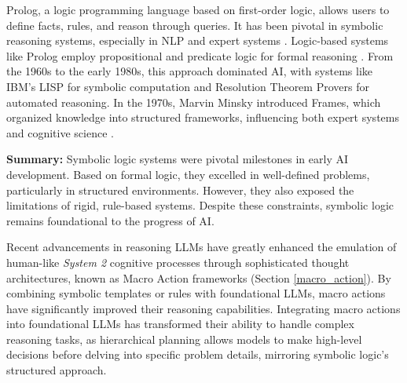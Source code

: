 Prolog, a logic programming language based on first-order logic, allows users to define facts, rules, and reason through queries. 
It has been pivotal in symbolic reasoning systems, especially in NLP and expert systems \cite{colmerauer1990introduction, clocksin2003programming, apt1997logic}. Logic-based systems like Prolog employ propositional and predicate logic for formal reasoning \cite{singh1999formal, jeroslow1988computation}. 
From the 1960s to the early 1980s, this approach dominated AI, with systems like IBM's LISP \cite{mccarthy1978history} for symbolic computation and Resolution Theorem Provers \cite{bachmair2001resolution} for automated reasoning. 
In the 1970s, Marvin Minsky introduced Frames, which organized knowledge into structured frameworks, influencing both expert systems and cognitive science \cite{minsky1974framework}.


\noindent\textbf{Summary:} 
Symbolic logic systems were pivotal milestones in early AI development. 
Based on formal logic, they excelled in well-defined problems, particularly in structured environments. 
However, they also exposed the limitations of rigid, rule-based systems. Despite these constraints, symbolic logic remains foundational to the progress of AI.

Recent advancements in reasoning LLMs have greatly enhanced the emulation of human-like \textit{System 2} cognitive processes through sophisticated thought architectures, known as Macro Action frameworks (Section \ref{macro_action}). By combining symbolic templates or rules with foundational LLMs, macro actions have significantly improved their reasoning capabilities. 
Integrating macro actions into foundational LLMs has transformed their ability to handle complex reasoning tasks, as hierarchical planning allows models to make high-level decisions before delving into specific problem details, mirroring symbolic logic's structured approach.





